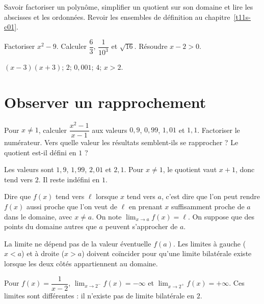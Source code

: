 \label{t11s-c02}
\begin{revision}Savoir factoriser un polynôme, simplifier un quotient sur son domaine et lire les abscisses et les ordonnées. Revoir les ensembles de définition au chapitre~\ref{t11s-c01}.\end{revision}
\begin{automatismes}\exo\label{t11s-c02-auto}Factoriser $x^2-9$. Calculer $\dfrac{6}{3}$, $\dfrac{1}{10^3}$ et $\sqrt{16}$. Résoudre $x-2>0$.\end{automatismes}
\begin{corrige}\label{sol-t11s-c02-auto}$(x-3)(x+3)$; $2$; $0{,}001$; $4$; $x>2$.\end{corrige}

\section{Observer un rapprochement}
\begin{situation}
\exo\label{t11s-c02-act}Pour $x\ne1$, calculer $\dfrac{x^2-1}{x-1}$ aux valeurs $0{,}9$, $0{,}99$, $1{,}01$ et $1{,}1$. Factoriser le numérateur. Vers quelle valeur les résultats semblent-ils se rapprocher ? Le quotient est-il défini en $1$ ?
\end{situation}
\begin{corrige}\label{sol-t11s-c02-act}Les valeurs sont $1{,}9$, $1{,}99$, $2{,}01$ et $2{,}1$. Pour $x\ne1$, le quotient vaut $x+1$, donc tend vers $2$. Il reste indéfini en $1$.\end{corrige}
\begin{definition}
Dire que $f(x)$ tend vers $\ell$ lorsque $x$ tend vers $a$, c’est dire que l’on peut rendre $f(x)$ aussi proche que l’on veut de $\ell$ en prenant $x$ suffisamment proche de $a$ dans le domaine, avec $x\ne a$. On note $\lim_{x\to a}f(x)=\ell$. On suppose que des points du domaine autres que $a$ peuvent s’approcher de $a$.
\end{definition}
\begin{remarque}La limite ne dépend pas de la valeur éventuelle $f(a)$. Les limites à gauche ($x<a$) et à droite ($x>a$) doivent coïncider pour qu’une limite bilatérale existe lorsque les deux côtés appartiennent au domaine.\end{remarque}
\begin{exemple}
Pour $f(x)=\dfrac1{x-2}$, $\lim_{x\to2^-}f(x)=-\infty$ et $\lim_{x\to2^+}f(x)=+\infty$. Ces limites sont différentes : il n’existe pas de limite bilatérale en $2$.
\end{exemple}
